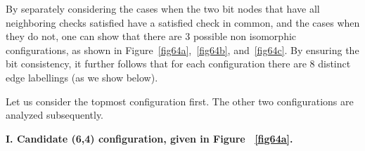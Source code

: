 By separately considering the cases when the two bit nodes that have
all neighboring checks satisfied have a satisfied check in common,
and the cases when they do not, one can show that there are 3
possible non isomorphic configurations, as shown in
Figure~\ref{fig64a},~\ref{fig64b}, and~\ref{fig64c}. By ensuring the
bit consistency, it further follows that for each configuration
there are 8 distinct edge labellings (as we show below).

Let us consider the topmost configuration first. The other two
configurations are analyzed subsequently.

\textbf{I. Candidate (6,4) configuration, given in Figure
~\ref{fig64a}.}


